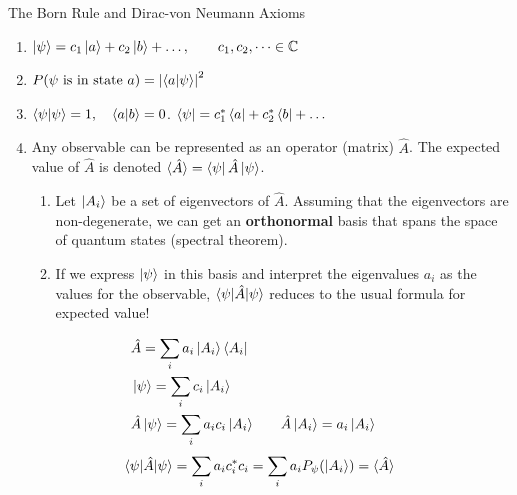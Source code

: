 \documentclass{beamer}
\begin{document}
\begin{frame}[allowframebreaks]{The Born Rule and Dirac-von Neumann Axioms}
\begin{enumerate}
\item $\ket{\psi} = c_1 \ket{a} + c_2 \ket{b} + \dots,\qquad c_1,c_2,\dots\in\mathbb{C}$
\item $P(\psi\text{ is in state }a)= \left\lvert\braket{a|\psi}\right\rvert^2$
\item $\braket{\psi|\psi} = 1, \quad \braket{a|b} = 0$. \qquad $\bra{\psi} = c_1^\ast \bra{a} + c_2^\ast \bra{b} + \dots$

\item Any observable can be represented as an operator (matrix) $\hat A$. The expected value of $\hat A$ is denoted
$\braket{\hat A} = \bra{\psi}\hat A\ket{\psi}$.

\begin{enumerate}
    \item Let $\ket{A_i}$ be a set of eigenvectors of $\hat A$. Assuming that the eigenvectors are non-degenerate, we can get an \textbf{orthonormal} basis that spans the space of quantum states (spectral theorem).
    
    \item If we express $\ket{\psi}$ in this basis and interpret the eigenvalues $a_i$ as the values for the observable, $\braket{\psi | \hat A |\psi}$ reduces to the usual formula for expected value! 
\end{enumerate}
\end{enumerate}

        \begin{align*}
        &\hat A = \sum_i a_i \ket{A_i}\bra{A_i}\\
        &\ket{\psi} = \sum_i c_i \ket{A_i} \\
        &\hat A \ket{\psi} = \sum_i a_i c_i \ket{A_i} &&\quad \hat A \ket{A_i} = a_i\ket{A_i}
    \end{align*}
        \[
        \braket{\psi|\hat A| \psi} = \sum_i a_i c_i^\ast c_i = \sum_i a_i P_\psi(\ket{A_i})=\langle\hat A\rangle 
        \]


\end{frame}
\end{document}
